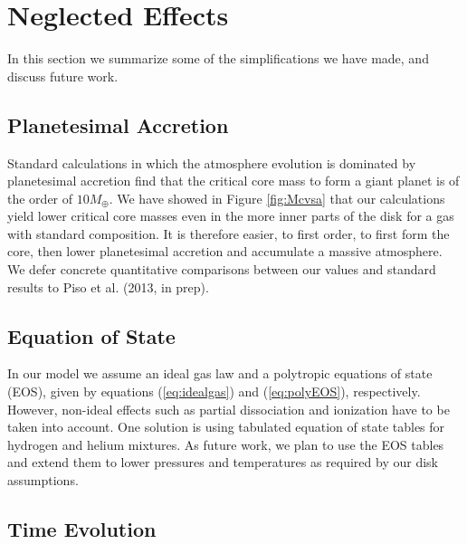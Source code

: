 \documentclass[apj]{emulateapj}
\begin{document}
 
 \section{Neglected Effects}
 \label{neglected}
 
 In this section we summarize some of the simplifications we have made, and discuss future work.
  
 \subsection{Planetesimal Accretion}
 
 
 Standard calculations in which the atmosphere evolution is dominated by planetesimal accretion find that the critical core mass to form a giant planet is of the order of $10 M_{\oplus}$. We have showed in Figure \ref{fig:Mcvsa} that our calculations yield lower critical core masses even in the more inner parts of the disk for a gas with standard composition. It is therefore easier, to first order, to first form the core, then lower planetesimal accretion and accumulate a massive atmosphere. We defer concrete quantitative comparisons between our values and standard results to Piso et al. (2013, in prep). 
 
 \subsection{Equation of State}
 \label{EOS}
 
 In our model we assume an ideal gas law and a polytropic equations of state (EOS), given by equations (\ref{eq:idealgas}) and (\ref{eq:polyEOS}), respectively. However, non-ideal effects such as partial dissociation and ionization have to be taken into account. One solution is using tabulated equation of state tables for hydrogen and helium mixtures. As future work, we plan to use the \citet{saumon95} EOS tables and extend them to lower pressures and temperatures as required by our disk assumptions.
 
 \subsection{Time Evolution}
 
\end{document}
